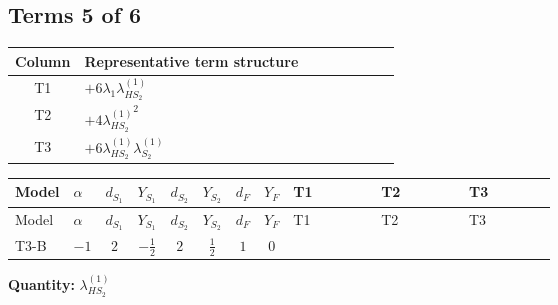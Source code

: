 \documentclass[8pt]{article}
\begin{document}
\begin{landscape}
\subsection*{Terms 5 of 6}
\begin{center}
\begin{tabular}{@{}c >{\raggedright\arraybackslash}p{0.82\linewidth}@{}}
\toprule
Column & Representative term structure \\
\midrule
T1 & \(\displaystyle +6 {\lambda_1} {\lambda_{HS_2}^{(1)}}\) \\
\midrule
T2 & \(\displaystyle +4 {\lambda_{HS_2}^{(1)}}^2\) \\
\midrule
T3 & \(\displaystyle +6 {\lambda_{HS_2}^{(1)}} {\lambda_{S_2}^{(1)}}\) \\
\midrule
\bottomrule
\end{tabular}
\end{center}
\smallskip
\tiny
\begin{longtable}{@{}llcccccc >{\raggedright\arraybackslash}p{0.21\linewidth} >{\raggedright\arraybackslash}p{0.21\linewidth} >{\raggedright\arraybackslash}p{0.21\linewidth}@{}}
\toprule
Model & $\alpha$ & $d_{S_1}$ & $Y_{S_1}$ & $d_{S_2}$ & $Y_{S_2}$ & $d_F$ & $Y_F$ & T1 & T2 & T3 \\
\midrule
\endfirsthead
\toprule
Model & $\alpha$ & $d_{S_1}$ & $Y_{S_1}$ & $d_{S_2}$ & $Y_{S_2}$ & $d_F$ & $Y_F$ & T1 & T2 & T3 \\
\midrule
\endhead
T3-B & $-1$ & $2$ & $-\frac{1}{2}$ & $2$ & $\frac{1}{2}$ & $1$ & $0$ & \scriptsize\adjustbox{max width=\linewidth}{$\begin{gathered} +6 {\lambda_1} {\lambda_{HS_2}^{(1)}}\end{gathered}$} & \scriptsize\adjustbox{max width=\linewidth}{$\begin{gathered} +4 {\lambda_{HS_2}^{(1)}}^2\end{gathered}$} & \scriptsize\adjustbox{max width=\linewidth}{$\begin{gathered} +6 {\lambda_{HS_2}^{(1)}} {\lambda_{S_2}^{(1)}}\end{gathered}$} \\
\midrule
\bottomrule
\end{longtable}
\clearpage
\noindent\textbf{Quantity: }$\lambda_{HS_2}^{(1)}$\par\smallskip

\end{landscape}
\end{document}
